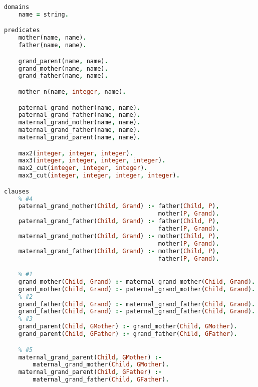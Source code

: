 \pagebreak

\begin{lstlisting}[language=Prolog]
domains
    name = string.

predicates
    mother(name, name).
    father(name, name).

    grand_parent(name, name).
    grand_mother(name, name).
    grand_father(name, name).

    mother_n(name, integer, name).

    paternal_grand_mother(name, name).
    paternal_grand_father(name, name).
    maternal_grand_mother(name, name).
    maternal_grand_father(name, name).
    maternal_grand_parent(name, name).

    max2(integer, integer, integer).
    max3(integer, integer, integer, integer).
    max2_cut(integer, integer, integer).
    max3_cut(integer, integer, integer, integer).

clauses
    % #4
    paternal_grand_mother(Child, Grand) :- father(Child, P),
                                           mother(P, Grand).
    paternal_grand_father(Child, Grand) :- father(Child, P),
                                           father(P, Grand).
    maternal_grand_mother(Child, Grand) :- mother(Child, P),
                                           mother(P, Grand).
    maternal_grand_father(Child, Grand) :- mother(Child, P),
                                           father(P, Grand).

    % #1
    grand_mother(Child, Grand) :- maternal_grand_mother(Child, Grand).
    grand_mother(Child, Grand) :- paternal_grand_mother(Child, Grand).
    % #2
    grand_father(Child, Grand) :- maternal_grand_father(Child, Grand).
    grand_father(Child, Grand) :- paternal_grand_father(Child, Grand).
    % #3
    grand_parent(Child, GMother) :- grand_mother(Child, GMother).
    grand_parent(Child, GFather) :- grand_father(Child, GFather).

    % #5
    maternal_grand_parent(Child, GMother) :-
        maternal_grand_mother(Child, GMother).
    maternal_grand_parent(Child, GFather) :-
        maternal_grand_father(Child, GFather).


\end{lstlisting}
